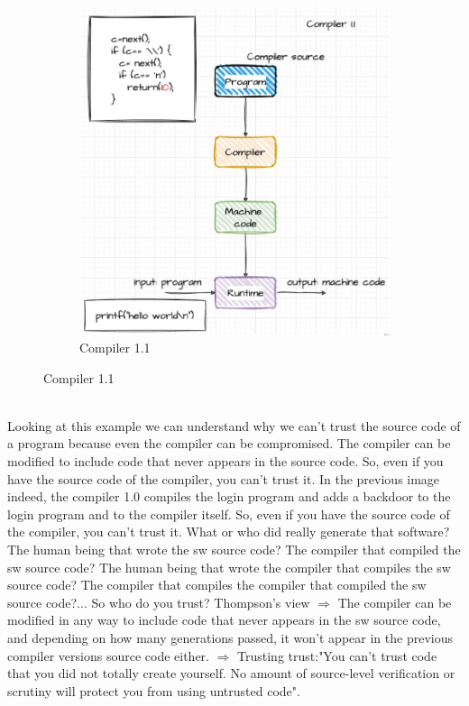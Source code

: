\begin{figure}[h]
\begin{subfigure}[b]{0.4\textwidth}
        \includegraphics[width=\textwidth]{Figures/Compiler1.png}
        \caption{Compiler 1.1}
        \label{Compiler 1.1}
    \end{subfigure}
\end{figure}
\\Looking at this example we can understand why we can't trust the source code of a program because even the compiler can be compromised. The compiler can be modified to include code that never appears in the source code. So, even if you have the source code of the compiler, you can't trust it. 
In the previous image indeed, the compiler 1.0 compiles the login program and adds a backdoor to the login program and to the compiler itself. So, even if you have the source code of the compiler, you can't trust it. 
What or who did really generate that software? The human being that wrote the sw source code? The compiler that compiled the sw source code? The human being that wrote the compiler that compiles the sw source code? The compiler that compiles the compiler that compiled the sw source code?...
So who do you trust?
Thompson’s view $\Rightarrow$ The compiler can be modified in any way to include code that never appears in the sw source code, and depending on how many generations passed, it won’t appear in the previous compiler versions source code either.
$\Rightarrow$ Trusting trust:"You can't trust code that you did not totally create yourself. No amount of source-level verification or scrutiny will protect you from using untrusted code"\cite{AttackTrees}.

